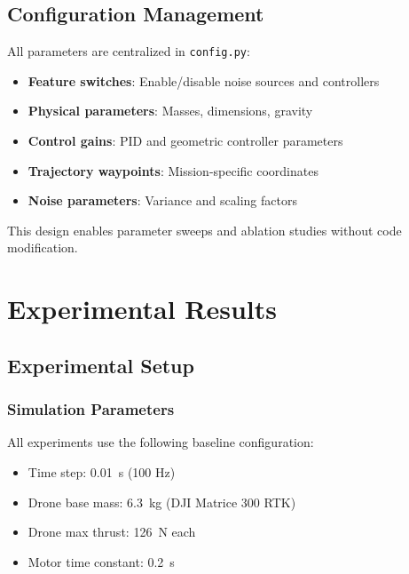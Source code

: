 \documentclass[12pt,a4paper]{article}
\begin{document}
\subsection{Configuration Management}

All parameters are centralized in \texttt{config.py}:
\begin{itemize}
    \item \textbf{Feature switches}: Enable/disable noise sources and controllers
    \item \textbf{Physical parameters}: Masses, dimensions, gravity
    \item \textbf{Control gains}: PID and geometric controller parameters
    \item \textbf{Trajectory waypoints}: Mission-specific coordinates
    \item \textbf{Noise parameters}: Variance and scaling factors
\end{itemize}

This design enables parameter sweeps and ablation studies without code modification.

\section{Experimental Results}
\label{sec:experiments}


\subsection{Experimental Setup}

\subsubsection{Simulation Parameters}
All experiments use the following baseline configuration:
\begin{itemize}
    \item Time step: \SI{0.01}{s} (100 Hz)
    \item Drone base mass: \SI{6.3}{kg} (DJI Matrice 300 RTK)
    \item Drone max thrust: \SI{126}{N} each
    \item Motor time constant: \SI{0.2}{s}
\end{itemize}
\end{document}
